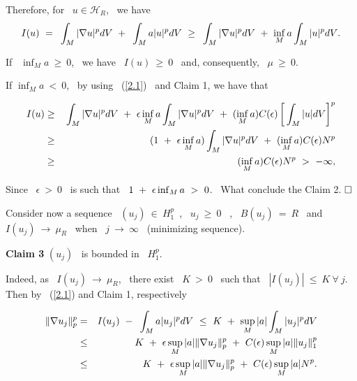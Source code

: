\documentclass[12pt]{article}
\begin{document}
Therefore, for \ $u \in \mathcal{H}_R$, \ we have 
\vspace{-0.5mm}
$$I(u) \ = \ {\displaystyle}\int_M{|\nabla u|^pdV} \ + \ {\displaystyle}\int_M{a|u|^pdV} \ \geq \ {\displaystyle}\int_M{|\nabla u|^pdV} \ + 
\ \inf_Ma{\displaystyle}\int_M{|u|^pdV}.$$

If \ $\inf_Ma \ \geq \ 0$, \ we have \ $I(u) \ \geq \ 0$ \ and, consequently, \ $\mu \ \geq \ 0$.

If $\inf_Ma \ < \ 0$, \ by using \ (\ref{2.1}) \ and Claim 1, we have that
\vspace{-0.8cm}

\begin{eqnarray*}
I(u) & \geq & {\displaystyle}\int_M{|\nabla u|^pdV} \ + \ \epsilon \inf_Ma {\displaystyle}\int_M{|\nabla u|^pdV} \ + 
\ (\inf_Ma)C(\epsilon)\left[{\displaystyle}\int_M{|u|dV}\right]^p \\
& \geq & (1 \ + \ \epsilon \inf_Ma){\displaystyle}\int_M{|\nabla u|^pdV} \ + \ (\inf_Ma)C(\epsilon)N^p \\
 & \geq & (\inf_Ma)C(\epsilon)N^p \ > \ - \infty, 
\end{eqnarray*}

\noindent  Since \ $\epsilon \ > \ 0$ \ is such that \ $1 \ + \ \epsilon {\displaystyle}\inf_Ma \ > \ 0$. \ What conclude the Claim 2.
 {$\hfill{\Box}$} 
{\vspace{0.2cm}}

Consider now a sequence \ $(u_j) \ \in \ H^p_1$\ , \ $u_j \ \geq \ 0$ \ , \ $B(u_j) \ = \ R$ \ and
 \ $I(u_j) \ \rightarrow \ \mu_R $ \ when \ $j \ \rightarrow \ \infty$ \ (minimizing sequence).

{\bf Claim 3}
$(u_j)$ \ is bounded in \ $H^p_1$.

Indeed, as \ $I(u_j) \ \rightarrow \ \mu_R$, \ there exist \ $K \ > \ 0$ \ 
such that \ $|I(u_j)| \ \leq \ K \ \forall \ j$. Then by \ (\ref{2.1}) and Claim 1, respectively 
\vspace{-0.8cm}

\begin{eqnarray*}
\|\nabla u_j\|^p_p & = & I(u_j) \ - \ {\displaystyle}\int_M{a|u_j|^pdV} \ \leq \ K \ + \ \sup_M|a|{\displaystyle}\int_M{|u_j|^pdV}\\
& \leq  & K \ + \ \epsilon\sup_M|a|\|\nabla u_j\|^p_p \ + \ C(\epsilon)\sup_M|a|\|u_j\|^p_1 \\
& \leq & K \ + \ \epsilon\sup_M|a|\|\nabla u_j\|^p_p \ + \ C(\epsilon)\sup_M|a|N^p. 
\end{eqnarray*}
\end{document}
